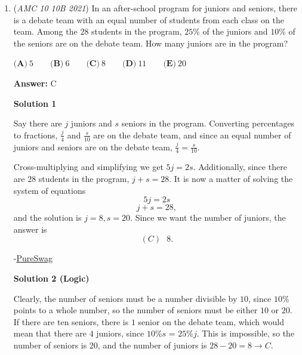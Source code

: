 \begin{enumerate}
 We get

 
 \[\sqrt{(3-2 \cdot 1.7)^2} + \sqrt{(3+2 \cdot 1.7)^2}\]

 \[= \sqrt{(-0.4)^2} + \sqrt{(6.4)^2}\]

 \[= \sqrt{0.16} + \sqrt{6.4^2}\]

 \[= 0.4 + 6.4\]

 \[= 6.8\]

 Looking at the answer choices, we see that $\boxed{\textbf{(D)} ~4\sqrt{3}}$ gives $6.8$ for when \( \sqrt{3} = 1.7 \).

 


	\item (\textit{AMC 10 10B 2021}) In an after-school program for juniors and seniors, there is a debate team with an equal number of students from each class on the team. Among the $28$ students in the program, $25\%$ of the juniors and $10\%$ of the seniors are on the debate team. How many juniors are in the program?


 $\textbf{(A)} ~5 \qquad\textbf{(B)} ~6 \qquad\textbf{(C)} ~8 \qquad\textbf{(D)} ~11 \qquad\textbf{(E)} ~20$

 \textbf{Answer: }C



\textbf{Solution 1}

Say there are $j$ juniors and $s$ seniors in the program. Converting percentages to fractions, $\frac{j}{4}$ and $\frac{s}{10}$ are on the debate team, and since an equal number of juniors and seniors are on the debate team, $\frac{j}{4} = \frac{s}{10}.$

 Cross-multiplying and simplifying we get $5j=2s.$ Additionally, since there are $28$ students in the program, $j+s = 28.$ It is now a matter of solving the system of equations 
 \[5j=2s\]
 \[j+s=28,\] and the solution is $j = 8, s = 20.$ Since we want the number of juniors, the answer is 
 \[\boxed{(C) \text{ } 8}.\]

 -\href{https://artofproblemsolving.com/wiki/index.php?title=User:PureSwag}{PureSwag}

 



\textbf{Solution 2 (Logic)}

Clearly, the number of seniors must be a number divisible by $10$, since $10\%$ points to a whole number, so the number of seniors must be either $10$ or $20$. If there are ten seniors, there is $1$ senior on the debate team, which would mean that there are $4$ juniors, since $10\%s$ = $25\%j$. This is impossible, so the number of seniors is 20, and the number of juniors is $28-20=8\rightarrow \boxed{C}$.


\end{enumerate}
